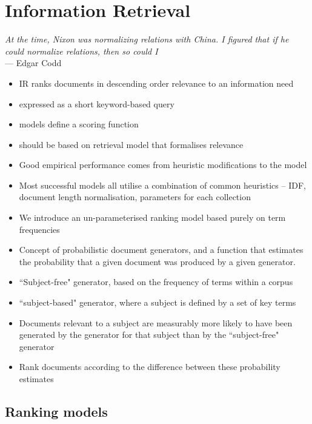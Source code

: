 \chapter{Information Retrieval}\label{ch:ir}
\begin{flushleft}{\slshape    
    At the time, Nixon was normalizing relations with China.  
    I figured that if he could normalize relations, then so could I} \\ \medskip
    --- Edgar Codd
\end{flushleft}
%
\begin{itemize}
\item IR ranks documents in descending order relevance to an information need
\item expressed as a short keyword-based query~\cite{robertson:1997}
\item models define a scoring function
\item should be based on retrieval model that formalises relevance
\item Good empirical performance comes from heuristic modifications to the model
\item Most successful models all utilise a combination of common heuristics -- IDF, document length normalisation, parameters for each collection
\item We introduce an un-parameterised ranking model based purely on term frequencies
\item Concept of probabilistic document generators, and a function that estimates the probability that a given document was produced by a given generator. 
\item ``Subject-free" generator, based on the frequency of terms within a corpus
\item ``subject-based" generator, where a subject is defined by a set of key terms
\item Documents relevant to a subject are measurably more likely to have been generated by the generator for that subject than by the ``subject-free" generator
\item Rank documents according to the difference between these probability  estimates
\end{itemize}
 
\section{Ranking models}
